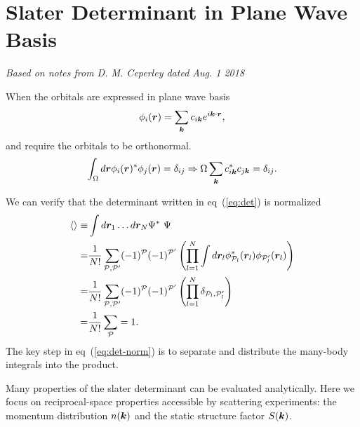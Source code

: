 \section{Slater Determinant in Plane Wave Basis}

\textit{Based on notes from D. M. Ceperley dated Aug. 1 2018}

When the orbitals are expressed in plane wave basis
\begin{align}
\phi_i(\boldsymbol{r}) = \sum\limits_{\boldsymbol{k}} c_{i\boldsymbol{k}} e^{i\boldsymbol{k}\cdot\boldsymbol{r}}, \label{eq:pw-orb}
\end{align}
and require the orbitals to be orthonormal.
\begin{align}
\int_\Omega d\boldsymbol{r} \phi_i(\boldsymbol{r})^*\phi_j(\boldsymbol{r}) = \delta_{ij} \Rightarrow 
\Omega \sum\limits_{\boldsymbol{k}} c_{i\boldsymbol{k}}^*c_{j\boldsymbol{k}} = \delta_{ij}. \label{eq:on_orbs}
\end{align}

We can verify that the determinant written in eq~(\ref{eq:det}) is normalized
\begin{align}
\braket{} \equiv& \int d\boldsymbol{r}_1\dots d\boldsymbol{r}_N \Psi^*~ \Psi \nonumber \\
=& \frac{1}{N!} \sum\limits_{\mathcal{P},\mathcal{P'}} (-1)^{\mathcal{P}} (-1)^{\mathcal{P'}}
\left(
\prod\limits_{l=1}^{N} \int d\boldsymbol{r}_l \phi^*_{\mathcal{P}_l}(\boldsymbol{r}_l)\phi_{\mathcal{P}_l'}(\boldsymbol{r}_l)
\right)\nonumber \\
=& \frac{1}{N!} \sum\limits_{\mathcal{P},\mathcal{P'}} (-1)^{\mathcal{P}} (-1)^{\mathcal{P'}}
\left(
\prod\limits_{l=1}^{N} \delta_{\mathcal{P}_l,\mathcal{P}_l'}
\right) \nonumber \\
=& \frac{1}{N!} \sum\limits_{\mathcal{P}} = 1. \label{eq:det-norm}
\end{align}
The key step in eq~(\ref{eq:det-norm}) is to separate and distribute the many-body integrals into the product.


Many properties of the slater determinant can be evaluated analytically. Here we focus on reciprocal-space properties accessible by scattering experiments: the momentum distribution $n(\boldsymbol{k})$ and the static structure factor $S(\boldsymbol{k})$. %

